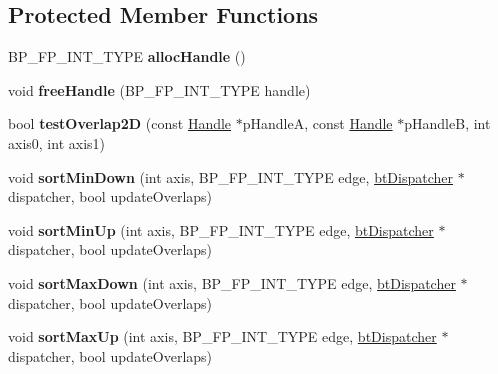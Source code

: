 \subsection*{Protected Member Functions}
\begin{DoxyCompactItemize}
\item 
\mbox{\label{classbtAxisSweep3Internal_a40b3512ebfeefbec480a906328053988}} 
B\+P\+\_\+\+F\+P\+\_\+\+I\+N\+T\+\_\+\+T\+Y\+PE {\bfseries alloc\+Handle} ()
\item 
\mbox{\label{classbtAxisSweep3Internal_ac40f411fe4911c17c681d47656296b26}} 
void {\bfseries free\+Handle} (B\+P\+\_\+\+F\+P\+\_\+\+I\+N\+T\+\_\+\+T\+Y\+PE handle)
\item 
\mbox{\label{classbtAxisSweep3Internal_a49abf8db2723c3ec699031539ab6e06d}} 
bool {\bfseries test\+Overlap2D} (const \hyperlink{classbtAxisSweep3Internal_1_1Handle}{Handle} $\ast$p\+HandleA, const \hyperlink{classbtAxisSweep3Internal_1_1Handle}{Handle} $\ast$p\+HandleB, int axis0, int axis1)
\item 
\mbox{\label{classbtAxisSweep3Internal_ac12a6524d4fe2b30f084be1c556e8087}} 
void {\bfseries sort\+Min\+Down} (int axis, B\+P\+\_\+\+F\+P\+\_\+\+I\+N\+T\+\_\+\+T\+Y\+PE edge, \hyperlink{classbtDispatcher}{bt\+Dispatcher} $\ast$dispatcher, bool update\+Overlaps)
\item 
\mbox{\label{classbtAxisSweep3Internal_ae2547559962876e0da7899dadca7f9aa}} 
void {\bfseries sort\+Min\+Up} (int axis, B\+P\+\_\+\+F\+P\+\_\+\+I\+N\+T\+\_\+\+T\+Y\+PE edge, \hyperlink{classbtDispatcher}{bt\+Dispatcher} $\ast$dispatcher, bool update\+Overlaps)
\item 
\mbox{\label{classbtAxisSweep3Internal_a345b7d853ad2a2449da0b51b1f35ff49}} 
void {\bfseries sort\+Max\+Down} (int axis, B\+P\+\_\+\+F\+P\+\_\+\+I\+N\+T\+\_\+\+T\+Y\+PE edge, \hyperlink{classbtDispatcher}{bt\+Dispatcher} $\ast$dispatcher, bool update\+Overlaps)
\item 
\mbox{\label{classbtAxisSweep3Internal_af8e014dfdce82a2d16dde9cb342fa58f}} 
void {\bfseries sort\+Max\+Up} (int axis, B\+P\+\_\+\+F\+P\+\_\+\+I\+N\+T\+\_\+\+T\+Y\+PE edge, \hyperlink{classbtDispatcher}{bt\+Dispatcher} $\ast$dispatcher, bool update\+Overlaps)

\end{DoxyCompactItemize}
